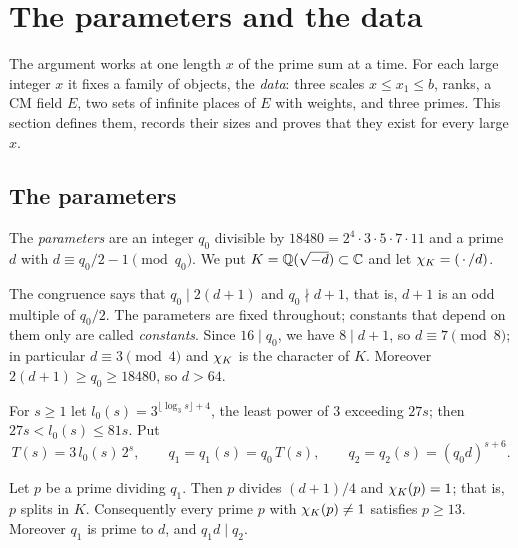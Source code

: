 \section{The parameters and the data}\label{sec:data}

The argument works at one length $x$ of the prime sum at a time. For each large integer $x$ it
fixes a family of objects, the \emph{data}: three scales $x\le x_1\le b$, ranks, a CM field $E$,
two sets of infinite places of $E$ with weights, and three primes. This section defines them,
records their sizes and proves that they exist for every large $x$.

\subsection{The parameters}\label{ss:parameters}

\begin{definition}\label{def:parameters}
The \emph{parameters} are an integer $q_0$ divisible by $18480=2^4\cdot3\cdot5\cdot7\cdot11$ and a
prime $d$ with $d\equiv q_0/2-1\pmod{q_0}$. We put $K=\mathbb{Q}(\sqrt{-d})\subset\mathbb{C}$ and let
$\chi_K=(\,\cdot\,/d)$.
\end{definition}

The congruence says that $q_0\mid2(d+1)$ and $q_0\nmid d+1$, that is, $d+1$ is an odd multiple of
$q_0/2$. The parameters are fixed throughout; constants that depend on them only are called
\emph{constants}. Since $16\mid q_0$, we have $8\mid d+1$, so $d\equiv7\pmod8$; in particular
$d\equiv3\pmod4$ and $\chi_K$ is the character of $K$. Moreover $2(d+1)\ge q_0\ge18480$, so $d>64$.

For $s\ge1$ let $l_0(s)=3^{\lfloor\log_3s\rfloor+4}$, the least power of $3$ exceeding $27s$; then
$27s<l_0(s)\le81s$. Put
\[
  T(s)=3\,l_0(s)\,2^s,\qquad q_1=q_1(s)=q_0\,T(s),\qquad q_2=q_2(s)=(q_0d)^{s+6}.
\]

\begin{lemma}\label{lem:split-primes}
Let $p$ be a prime dividing $q_1$. Then $p$ divides $(d+1)/4$ and $\chi_K(p)=1$; that is, $p$ splits
in $K$. Consequently every prime $p$ with $\chi_K(p)\neq1$ satisfies $p\ge13$. Moreover $q_1$ is prime
to $d$, and $q_1d\mid q_2$.
\end{lemma}

